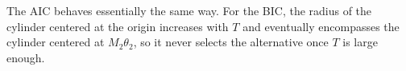 The AIC behaves essentially the same way. For the BIC, the radius of
the cylinder centered at the origin increases with $T$ and eventually
encompasses the cylinder centered at $M_2 \theta_2$, so it never
selects the alternative once $T$ is large enough.

